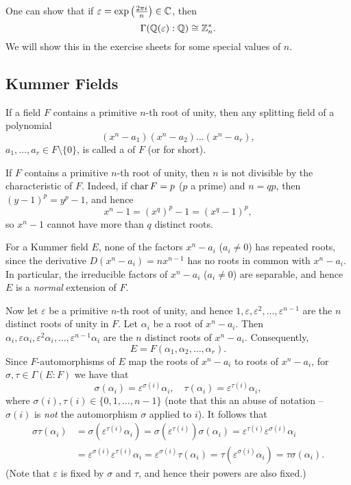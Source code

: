 \begin{remark}
	One can show that if $\varepsilon = \exp\left(\frac{2\pi i}{n}\right) \in \mathbb{C}$, then
	\[
		\Gamma(\mathbb{Q}(\varepsilon) : \mathbb{Q}) \cong \mathbb{Z}_n^*.
	\]
	We will show this in the exercise sheets for some special values of $n$.
\end{remark}

\subsection{Kummer Fields}
\begin{definition}
	If a field $F$ contains a primitive $n$-th root of unity, then any splitting field of a polynomial
	\[
		(x^n - a_1)(x^n - a_2)\dots(x^n - a_r),
	\]
	$a_1, \dots, a_r \in F \setminus \{0\}$, is called a  of $F$ (or  for short).
\end{definition}

\begin{remark}
	If $F$ contains a primitive $n$-th root of unity, then $n$ is not divisible by the characteristic of $F$. Indeed, if $\operatorname{char}{F} = p$ ($p$ a prime) and $n = qp$, then $(y - 1)^p = y^p - 1$, and hence
	\[
		x^n - 1 = (x^q)^p - 1 = (x^q - 1)^p,
	\]
	so $x^n - 1$ cannot have more than $q$ distinct roots.
\end{remark}

For a Kummer field $E$, none of the factors $x^n - a_i$ ($a_i \neq 0$) has repeated roots, since the derivative $D(x^n - a_i) = nx^{n - 1}$ has no roots in common with $x^n - a_i$. In particular, the irreducible factors of $x^n - a_i$ ($a_i \neq 0$) are separable, and hence $E$ is a \emph{normal} extension of $F$.

Now let $\varepsilon$ be a primitive $n$-th root of unity, and hence $1, \varepsilon, \varepsilon^2, \dots, \varepsilon^{n - 1}$ are the $n$ distinct roots of unity in $F$. Let $\alpha_i$ be a root of $x^n - a_i$. Then $\alpha_i, \varepsilon\alpha_i, \varepsilon^2 \alpha_i, \dots, \varepsilon^{n - 1} \alpha_i$ are the $n$ distinct roots of $x^n - a_i$. Consequently,
\[
	E = F(\alpha_1, \alpha_2, \dots, \alpha_r).
\]
Since $F$-automorphisms of $E$ map the roots of $x^n - a_i$ to roots of $x^n - a_i$, for $\sigma, \tau \in \Gamma(E : F)$ we have that
\[
	\sigma(\alpha_i) = \varepsilon^{\sigma(i)} \alpha_i, \quad \tau(\alpha_i) = \varepsilon^{\tau(i)} \alpha_i,
\]
where $\sigma(i), \tau(i) \in \{0, 1, \dots, n - 1\}$ (note that this an abuse of notation -- $\sigma(i)$ is \emph{not} the automorphism $\sigma$ applied to $i$). It follows that
\begin{align*}
	\sigma\tau(\alpha_i) &= \sigma(\varepsilon^{\tau(i)} \alpha_i) = \sigma(\varepsilon^{\tau(i)}) \sigma(\alpha_i) = \varepsilon^{\tau(i)} \varepsilon^{\sigma(i)} \alpha_i \\
		&= \varepsilon^{\sigma(i)} \varepsilon^{\tau(i)} \alpha_i = \varepsilon^{\sigma(i)} \tau(\alpha_i) = \tau(\varepsilon^{\sigma(i)} \alpha_i) = \tau\sigma(\alpha_i).
\end{align*}
(Note that $\varepsilon$ is fixed by $\sigma$ and $\tau$, and hence their powers are also fixed.)

